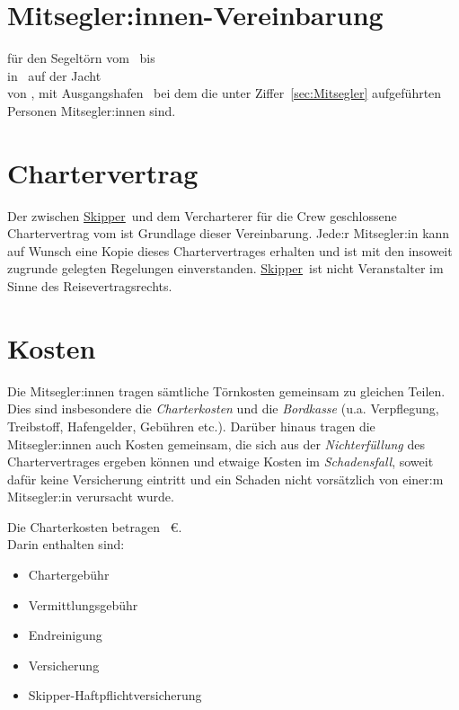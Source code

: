 \documentclass[a4paper,12pt]{article}
\newcommand{\openlength}[1]{\hspace{0.25cm} \makebox[#1]{\hrulefill}\hspace{0.25cm}}
\newcommand{\open}{\openlength{4cm}}
\newcommand{\skipper}{\underline{Skipper}} %
\newcommand{\vercharterer}{\open} %
\begin{document}
\section*{Mitsegler:innen-Vereinbarung}

für den Segeltörn vom \open\ bis \open \\
in \open\ auf der Jacht \open \\
von \vercharterer, mit Ausgangshafen \open\ 
bei dem die unter Ziffer~\ref{sec:Mitsegler} aufgeführten Personen Mitsegler:innen sind.


\section{Chartervertrag}
\label{sec:Chartervertrag}

Der zwischen \skipper\ und dem Vercharterer für die Crew geschlossene Chartervertrag vom ist Grundlage dieser Vereinbarung.
Jede:r Mitsegler:in kann auf Wunsch eine Kopie dieses Chartervertrages erhalten und ist mit den insoweit zugrunde gelegten Regelungen einverstanden.
\skipper\ ist nicht Veranstalter im Sinne des Reisevertragsrechts.


\section{Kosten}
\label{sec:Kosten}

Die Mitsegler:innen tragen sämtliche Törnkosten gemeinsam zu gleichen Teilen.
Dies sind insbesondere die \textit{Charterkosten} und die \textit{Bordkasse} (u.a. Verpflegung, Treibstoff, Hafengelder, Gebühren etc.).
Darüber hinaus tragen die Mitsegler:innen auch Kosten gemeinsam, die sich aus der \textit{Nichterfüllung} des Chartervertrages ergeben können und etwaige Kosten im \textit{Schadensfall}, soweit dafür keine Versicherung eintritt und ein Schaden nicht vorsätzlich von einer:m Mitsegler:in verursacht wurde.


Die Charterkosten betragen \mbox{\openlength{1cm}\euro}.\\
Darin enthalten sind:
\begin{itemize}
	\item Chartergebühr
	\item Vermittlungsgebühr
	\item Endreinigung
	\item Versicherung
	\item Skipper-Haftpflichtversicherung
\end{itemize}
\end{document}
